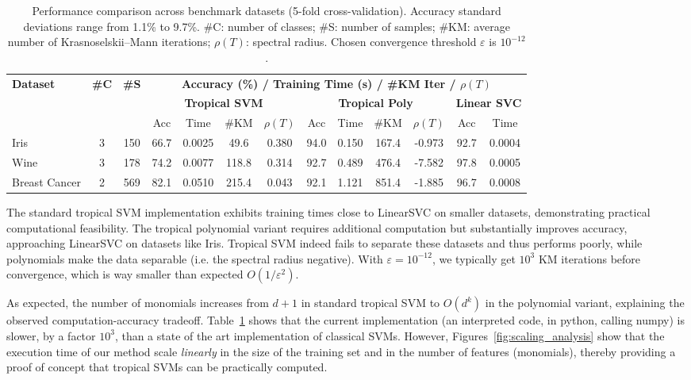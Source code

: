\documentclass{article}
\begin{document}
\begin{table}[h]
    \centering
    \footnotesize
    \begin{tabular}{@{}l@{\hskip 4pt}c@{\hskip 4pt}c@{\hskip 8pt}ccc@{\hskip 4pt}c@{\hskip 8pt}cccc@{\hskip 8pt}cc@{}}
    \toprule
    \multirow{3}{*}{\textbf{Dataset}} & \multirow{3}{*}{\textbf{\#C}} & \multirow{3}{*}{\textbf{\#S}} & \multicolumn{10}{c}{\textbf{Accuracy (\%) / Training Time (s) / \#KM Iter / $\rho(T)$}} \\
    \cmidrule(lr){4-13}
    & & & \multicolumn{4}{c}{\textbf{Tropical SVM}} & \multicolumn{4}{c}{\textbf{Tropical Poly}} & \multicolumn{2}{c}{\textbf{Linear SVC}} \\
    \cmidrule(lr){4-7} \cmidrule(lr){8-11} \cmidrule(lr){12-13}
    & & & Acc & Time & \#KM & $\rho(T)$ & Acc & Time & \#KM & $\rho(T)$ & Acc & Time \\
    \midrule
    Iris & 3 & 150 & 66.7 & 0.0025 & 49.6 & 0.380 & 94.0 & 0.150 & 167.4 & -0.973 & 92.7 & 0.0004 \\
    Wine & 3 & 178 & 74.2 & 0.0077 & 118.8 & 0.314 & 92.7 & 0.489 & 476.4 & -7.582 & 97.8 & 0.0005 \\
    Breast Cancer & 2 & 569 & 82.1 & 0.0510 & 215.4 & 0.043 & 92.1 & 1.121 & 851.4 & -1.885 & 96.7 & 0.0008 \\
    \bottomrule
    \end{tabular}
    \vspace{0.5em}
    \caption{Performance comparison across benchmark datasets (5-fold cross-validation). Accuracy standard deviations range from 1.1\% to 9.7\%. \#C: number of classes; \#S: number of samples; \#KM: average number of Krasnoselskii--Mann iterations; $\rho(T)$: spectral radius.
    Chosen convergence threshold $\varepsilon$ is $10^{-12}$.}
    \label{tab:benchmark_results}
\end{table}

The standard tropical SVM implementation exhibits training times close to LinearSVC on smaller datasets, demonstrating practical computational feasibility. The tropical polynomial variant requires additional computation but substantially improves accuracy, approaching LinearSVC on datasets like Iris.
Tropical SVM indeed fails to separate these datasets and thus performs poorly, while polynomials make the data separable (i.e. the spectral radius negative).
With $\varepsilon = 10^{-12}$, we typically get $10^3$ KM iterations before convergence, which is way smaller than expected $O(1/\varepsilon^2)$.

As expected, the number of monomials increases from $d+1$ in standard tropical SVM to $O(d^k)$ in the polynomial variant, explaining the observed computation-accuracy tradeoff. Table~\ref{tab:benchmark_results}
shows that the current implementation (an interpreted code, in python, calling numpy) is slower, by a factor $10^3$, than a state of the art implementation of classical SVMs. However, Figures~\ref{fig:scaling_analysis} show that the execution time of our method scale {\em linearly} in the size of the training set and in the number of features (monomials), thereby providing
a proof of concept that tropical SVMs can be practically computed.
\end{document}
